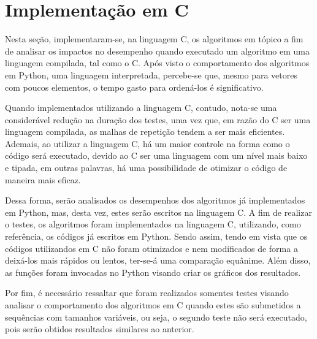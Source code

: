 \section{Implementação em C}
Nesta seção, implementaram-se, na linguagem C, os algoritmos em tópico a fim de analisar os impactos no desempenho quando executado um algoritmo em uma linguagem compilada, tal como o C.
Após visto o comportamento dos algoritmos em Python, uma linguagem interpretada, percebe-se que, mesmo para vetores com poucos elementos, o tempo gasto para ordená-los é significativo.

Quando implementados utilizando a linguagem C, contudo, nota-se uma considerável redução na duração dos testes, uma vez que, em razão do C ser uma linguagem compilada, as malhas de repetição tendem a ser mais eficientes.
Ademais, ao utilizar a linguagem C, há um maior controle na forma como o código será executado, devido ao C ser uma linguagem com um nível mais baixo e tipada, em outras palavras, há uma possibilidade de otimizar o código de maneira mais eficaz.


Dessa forma, serão analisados os desempenhos dos algoritmos já implementados em Python, mas, desta vez, estes serão escritos na linguagem C.
A fim de realizar o testes, os algoritmos foram implementados na linguagem C, utilizando, como referência, os códigos já escritos em Python. Sendo assim, tendo em vista que os códigos utilizandos em C não foram otimizados e nem modificados de forma a deixá-los mais rápidos ou lentos, ter-se-á uma comparação equânime.
Além disso, as funções foram invocadas no Python visando criar os gráficos dos resultados.

Por fim, é necessário ressaltar que foram realizados somentes testes visando analisar o comportamento dos algoritmos em C quando estes são submetidos a sequências com tamanhos variáveis, ou seja, o segundo teste não será executado, pois serão obtidos resultados similares ao anterior.

\newpage
